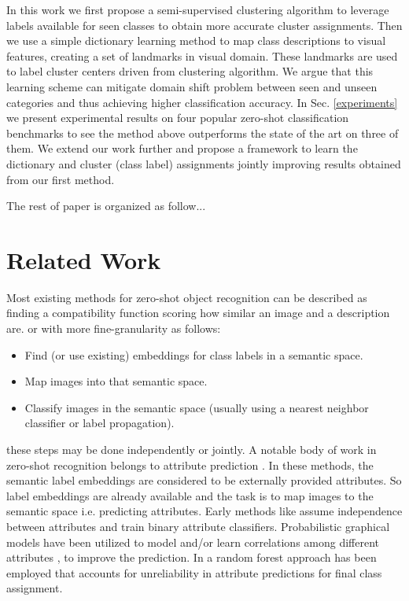 \documentclass[wcp]{jmlr}
\begin{document}
 In this work
 we first propose a
  semi-supervised clustering algorithm to leverage labels available for seen classes to obtain more accurate cluster assignments.
 Then we use a simple dictionary learning method to map class descriptions to visual features, creating a set of landmarks in
 visual domain. These landmarks are used to label cluster centers driven from clustering algorithm. We argue that this learning
 scheme can mitigate domain shift problem \cite{eccv14} between seen and unseen categories and thus achieving higher classification accuracy.
In Sec. \ref{experiments} we present experimental results on four popular zero-shot classification benchmarks to see
the method above outperforms the state of the art on three of them.
 We extend our work further and propose a framework to learn the dictionary and cluster (class label) assignments jointly
 improving results obtained from our first method.

The rest of paper is organized as follow...
\section{Related Work}
Most existing methods for zero-shot object recognition can be described as finding a compatibility function scoring how
similar an image and a description are.
or with more fine-granularity as follows:
\begin{itemize}
  \item Find (or use existing) embeddings for class labels in a semantic space.
  \item Map images into that semantic space.
  \item Classify images in the semantic space (usually using a nearest neighbor classifier or label propagation).
\end{itemize}
these steps may be done independently or jointly.
A notable body of work in zero-shot recognition belongs to attribute prediction  \cite{lampert09, topicmodel, ajoint11, unified13, suzuki14}.
In these methods, the semantic label embeddings are considered to be externally provided attributes. So label embeddings are
already available and the task is to map images to the semantic space i.e. predicting attributes.
Early methods like \cite{lampert09} assume independence between attributes and train binary attribute classifiers.
Probabilistic graphical models have been utilized to model and/or learn correlations among different attributes \cite{topicmodel, unified13}, to improve the prediction.
In \cite{jayaraman14}  a random forest approach has been employed that accounts for unreliability in attribute predictions
 for final class assignment.
\end{document}
